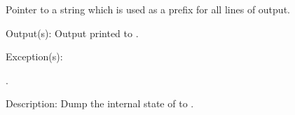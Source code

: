 \begin{capi}
\begin{capilist}
\begin{description}
			Pointer to a string which is used as a prefix for all
			lines of output.
		\end{description}
	\item[Output(s): ]
		Output printed to .
	\item[Exception(s): ]
		\begin{description}\item[]
		\item[.]
		\end{description}
	\item[Description: ]
		Dump the internal state of  to .
	\end{capilist}
\end{capi}
